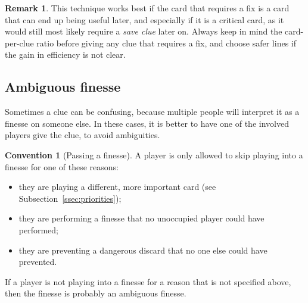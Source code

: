 \documentclass[a4paper]{article}
\theoremstyle{plain}
\theoremstyle{definition}
\newtheorem{remark}[theorem]{Remark}
\newtheorem{convention}[theorem]{Convention}
\begin{document}
\begin{remark}
	This technique works best if the card that requires a fix is a card that can end up being useful later, and especially if it is a critical card, as it would still most likely require a \emph{save clue} later on. Always keep in mind the card-per-clue ratio before giving any clue that requires a fix, and choose safer lines if the gain in efficiency is not clear.
\end{remark}

\subsection{Ambiguous finesse}

Sometimes a clue can be confusing, because multiple people will interpret it as a finesse on someone else. In these cases, it is better to have one of the involved players give the clue, to avoid ambiguities.

\begin{convention}[Passing a finesse]
	A player is only allowed to skip playing into a finesse for one of these reasons:
	
	\begin{itemize}
		\item they are playing a different, more important card (see Subsection~\ref{ssec:priorities});
		\item they are performing a finesse that no unoccupied player could have performed;
		\item they are preventing a dangerous discard that no one else could have prevented.
	\end{itemize}

	If a player is not playing into a finesse for a reason that is not specified above, then the finesse is probably an ambiguous finesse.
\end{convention}
\end{document}
